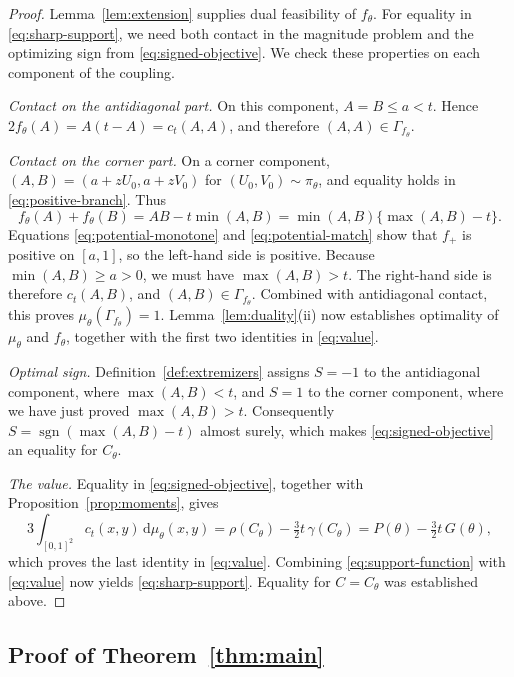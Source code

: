\documentclass{article}
\theoremstyle{definition}
\theoremstyle{remark}
\newcommand{\1}{\mathds{1}}
\newcommand{\de}{\,\mathrm{d}}
\newcommand{\I}{[0,1]}
\DeclareMathOperator{\sgn}{sgn}
\begin{document}
\begin{proof}
	Lemma~\ref{lem:extension} supplies dual feasibility of $f_\theta$.
	For equality in \eqref{eq:sharp-support}, we need both contact in the magnitude problem and the optimizing sign from \eqref{eq:signed-objective}. We check these properties on each component of the coupling.

	\emph{Contact on the antidiagonal part.}
	On this component, $A=B\le a<t$. Hence $2f_\theta(A)=A(t-A)=c_t(A,A)$, and therefore $(A,A)\in\Gamma_{f_\theta}$.

	\emph{Contact on the corner part.}
	On a corner component, $(A,B)=(a+zU_0,a+zV_0)$ for $(U_0,V_0)\sim\pi_\theta$, and equality holds in \eqref{eq:positive-branch}. Thus
	\[
		f_\theta(A)+f_\theta(B)=AB-t\min(A,B)=\min(A,B)\{\max(A,B)-t\}.
	\]
	Equations \eqref{eq:potential-monotone} and \eqref{eq:potential-match} show that $f_+$ is positive on $[a,1]$, so the left-hand side is positive.
	Because $\min(A,B)\ge a>0$, we must have $\max(A,B)>t$. The right-hand side is therefore $c_t(A,B)$, and $(A,B)\in\Gamma_{f_\theta}$.
	Combined with antidiagonal contact, this proves $\mu_\theta(\Gamma_{f_\theta})=1$. Lemma~\ref{lem:duality}(ii) now establishes optimality of $\mu_\theta$ and $f_\theta$, together with the first two identities in \eqref{eq:value}.

	\emph{Optimal sign.}
	Definition~\ref{def:extremizers} assigns $S=-1$ to the antidiagonal component, where $\max(A,B)<t$, and $S=1$ to the corner component, where we have just proved $\max(A,B)>t$.
	Consequently $S=\sgn(\max(A,B)-t)$ almost surely, which makes \eqref{eq:signed-objective} an equality for $C_\theta$.

	\emph{The value.}
	Equality in \eqref{eq:signed-objective}, together with Proposition~\ref{prop:moments}, gives
	\[
		3\int_{\I^2}c_t(x,y)\de\mu_\theta(x,y)=\rho(C_\theta)-\tfrac32t\,\gamma(C_\theta)=P(\theta)-\tfrac32t\,G(\theta),
	\]
	which proves the last identity in \eqref{eq:value}.
	Combining \eqref{eq:support-function} with \eqref{eq:value} now yields \eqref{eq:sharp-support}. Equality for $C=C_\theta$ was established above.
\end{proof}

\subsection{Proof of Theorem~\ref{thm:main}}\label{sec:completeness}
\end{document}
